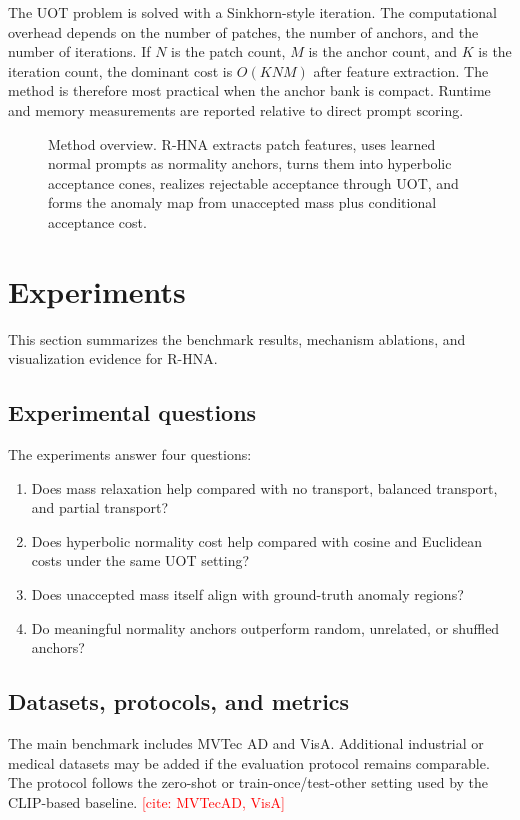 \documentclass[10pt]{article}
\newcommand{\method}{R-HNA}
\newcommand{\needcite}[1]{\textcolor{red}{[cite: #1]}}
\newcommand{\figtodo}[1]{\textcolor{red}{[FIGURE TODO: #1]}}
\newcommand{\placeholderfigure}[2]{
\begin{figure}[t]
    \centering
    \fbox{
    \begin{minipage}[c][0.18\textheight][c]{0.92\linewidth}
        \centering
        \figtodo{#1}
    \end{minipage}}
    \caption{#2}
    \label{fig:#1}
\end{figure}
}
\begin{document}
The UOT problem is solved with a Sinkhorn-style iteration.
The computational overhead depends on the number of patches, the number of anchors, and the number of iterations.
If $N$ is the patch count, $M$ is the anchor count, and $K$ is the iteration count, the dominant cost is $O(KNM)$ after feature extraction.
The method is therefore most practical when the anchor bank is compact.
Runtime and memory measurements are reported relative to direct prompt scoring.

\placeholderfigure{method}{Method overview. \method{} extracts patch features, uses learned normal prompts as normality anchors, turns them into hyperbolic acceptance cones, realizes rejectable acceptance through UOT, and forms the anomaly map from unaccepted mass plus conditional acceptance cost.}

\section{Experiments}

This section summarizes the benchmark results, mechanism ablations, and visualization evidence for \method{}.

\subsection{Experimental questions}

The experiments answer four questions:
\begin{enumerate}[leftmargin=*]
    \item Does mass relaxation help compared with no transport, balanced transport, and partial transport?
    \item Does hyperbolic normality cost help compared with cosine and Euclidean costs under the same UOT setting?
    \item Does unaccepted mass itself align with ground-truth anomaly regions?
    \item Do meaningful normality anchors outperform random, unrelated, or shuffled anchors?
\end{enumerate}

\subsection{Datasets, protocols, and metrics}

The main benchmark includes MVTec AD and VisA.
Additional industrial or medical datasets may be added if the evaluation protocol remains comparable.
The protocol follows the zero-shot or train-once/test-other setting used by the CLIP-based baseline.
\needcite{MVTecAD, VisA}
\end{document}
